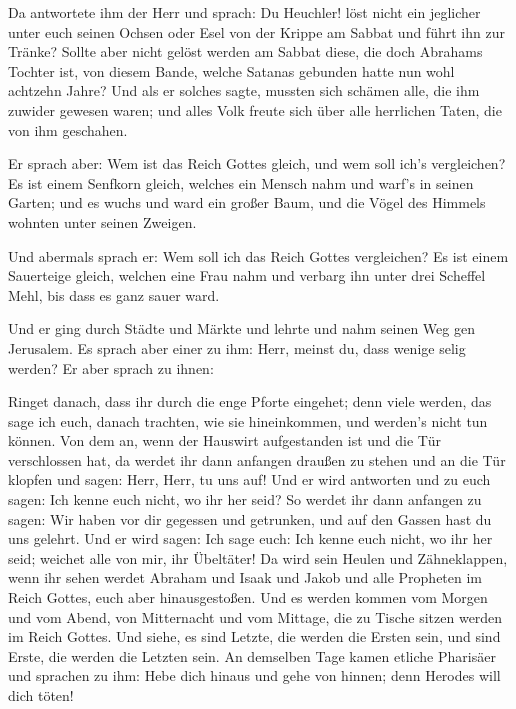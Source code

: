  Da antwortete ihm der Herr und sprach: Du Heuchler! löst
nicht ein jeglicher unter euch seinen Ochsen oder Esel von der Krippe am
Sabbat und führt ihn zur Tränke?  Sollte aber nicht
gelöst werden am Sabbat diese, die doch Abrahams Tochter ist, von diesem
Bande, welche Satanas gebunden hatte nun wohl achtzehn Jahre?
 Und als er solches sagte, mussten sich schämen alle, die
ihm zuwider gewesen waren; und alles Volk freute sich über alle
herrlichen Taten, die von ihm geschahen.

 Er sprach aber: Wem ist das Reich Gottes gleich, und wem
soll ich's vergleichen?  Es ist einem Senfkorn gleich,
welches ein Mensch nahm und warf's in seinen Garten; und es wuchs und
ward ein großer Baum, und die Vögel des Himmels wohnten unter seinen
Zweigen.

 Und abermals sprach er: Wem soll ich das Reich Gottes
vergleichen?  Es ist einem Sauerteige gleich, welchen
eine Frau nahm und verbarg ihn unter drei Scheffel Mehl, bis dass es
ganz sauer ward.

 Und er ging durch Städte und Märkte und lehrte und nahm
seinen Weg gen Jerusalem.  Es sprach aber einer zu ihm:
Herr, meinst du, dass wenige selig werden? Er aber sprach zu ihnen:

 Ringet danach, dass ihr durch die enge Pforte eingehet;
denn viele werden, das sage ich euch, danach trachten, wie sie
hineinkommen, und werden's nicht tun können.  Von dem an,
wenn der Hauswirt aufgestanden ist und die Tür verschlossen hat, da
werdet ihr dann anfangen draußen zu stehen und an die Tür klopfen und
sagen: Herr, Herr, tu uns auf! Und er wird antworten und zu euch sagen:
Ich kenne euch nicht, wo ihr her seid?  So werdet ihr
dann anfangen zu sagen: Wir haben vor dir gegessen und getrunken, und
auf den Gassen hast du uns gelehrt.  Und er wird sagen:
Ich sage euch: Ich kenne euch nicht, wo ihr her seid; weichet alle von
mir, ihr Übeltäter!  Da wird sein Heulen und
Zähneklappen, wenn ihr sehen werdet Abraham und Isaak und Jakob und alle
Propheten im Reich Gottes, euch aber hinausgestoßen.  Und
es werden kommen vom Morgen und vom Abend, von Mitternacht und vom
Mittage, die zu Tische sitzen werden im Reich Gottes. 
Und siehe, es sind Letzte, die werden die Ersten sein, und sind Erste,
die werden die Letzten sein.  An demselben Tage kamen
etliche Pharisäer und sprachen zu ihm: Hebe dich hinaus und gehe von
hinnen; denn Herodes will dich töten!

